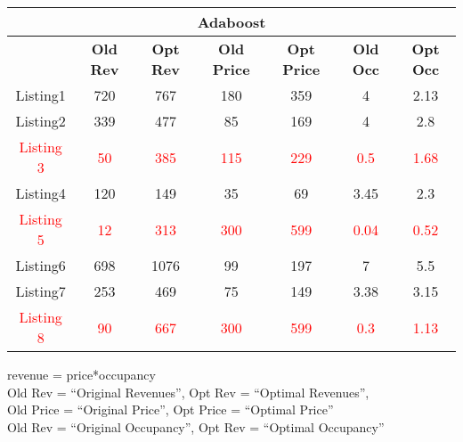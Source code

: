 \documentclass[12pt]{article}
\begin{document}
\begin{center}
\begin{tabular}{ |c|c|c|c|c|c|c| }
 \multicolumn{7}{|c|}{\textbf{Adaboost}}\\
 
 \hline 

  & \textbf{Old Rev}  & \textbf{Opt Rev} & \textbf{Old Price} & \textbf{Opt Price}& \textbf{Old Occ}& \textbf{Opt Occ}\\ [0.05cm]
 \hline
 Listing1 & 720 & 767 &180 &359  &4 &2.13\\ 
 \hline
 Listing2 & 339 & 477 &85 &169  &4 &2.8   \\ 
 \hline
  \textcolor{red}{Listing 3}   & \textcolor{red}{50} & \textcolor{red}{385} & \textcolor{red}{115} & \textcolor{red}{229}  & \textcolor{red}{0.5} & \textcolor{red}{1.68} \\
 \hline
  Listing4   & 120 & 149 &35 &69  &3.45 &2.3 \\
 \hline
 \textcolor{red}{Listing 5}   & \textcolor{red}{12} & \textcolor{red}{313} & \textcolor{red}{300} & \textcolor{red}{599}  & \textcolor{red}{0.04} & \textcolor{red}{0.52} \\
 \hline
  Listing6   & 698 & 1076 &99 &197  &7 &5.5 \\
 \hline 
 Listing7   & 253 & 469 &75 &149  &3.38 &3.15 \\
 \hline
  \textcolor{red}{Listing 8}   & \textcolor{red}{90} & \textcolor{red}{667} & \textcolor{red}{300} & \textcolor{red}{599}  & \textcolor{red}{0.3} & \textcolor{red}{1.13} \\
 \hline

\end{tabular}

 revenue = price*occupancy\\Old Rev = ``Original Revenues'', Opt Rev = ``Optimal Revenues'', \\ Old Price = ``Original Price'', Opt Price = ``Optimal Price''\\Old Rev = ``Original Occupancy'', Opt Rev = ``Optimal Occupancy''

\end{center}
\end{document}
